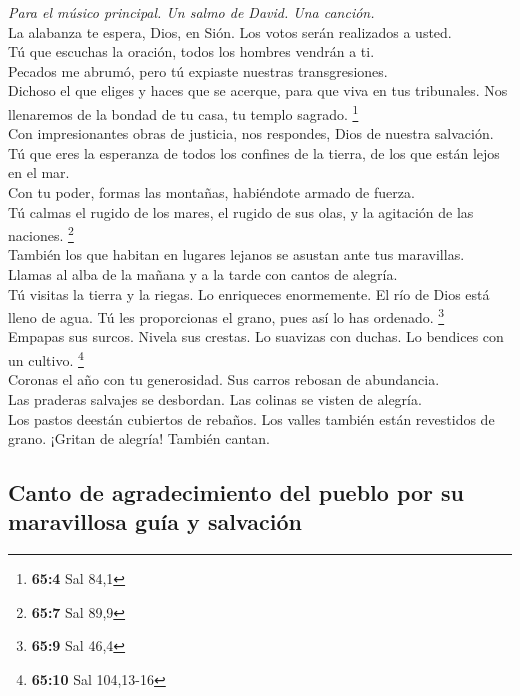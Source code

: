 \emph{Para el músico principal. Un salmo de David. Una canción.}\\
 La alabanza te espera, Dios, en Sión. Los votos serán
realizados a usted.\\
 Tú que escuchas la oración, todos los hombres vendrán a
ti.\\
 Pecados me abrumó, pero tú expiaste nuestras
transgresiones.\\
 Dichoso el que eliges y haces que se acerque, para que
viva en tus tribunales. Nos llenaremos de la bondad de tu casa, tu
templo sagrado. \footnote{\textbf{65:4} Sal 84,1}\\
 Con impresionantes obras de justicia, nos respondes, Dios
de nuestra salvación. Tú que eres la esperanza de todos los confines de
la tierra, de los que están lejos en el mar.\\
 Con tu poder, formas las montañas, habiéndote armado de
fuerza.\\
 Tú calmas el rugido de los mares, el rugido de sus olas,
y la agitación de las naciones. \footnote{\textbf{65:7} Sal 89,9}\\
 También los que habitan en lugares lejanos se asustan
ante tus maravillas. Llamas al alba de la mañana y a la tarde con cantos
de alegría.\\
 Tú visitas la tierra y la riegas. Lo enriqueces
enormemente. El río de Dios está lleno de agua. Tú les proporcionas el
grano, pues así lo has ordenado. \footnote{\textbf{65:9} Sal 46,4}\\
 Empapas sus surcos. Nivela sus crestas. Lo suavizas con
duchas. Lo bendices con un cultivo. \footnote{\textbf{65:10} Sal
  104,13-16}\\
 Coronas el año con tu generosidad. Sus carros rebosan de
abundancia.\\
 Las praderas salvajes se desbordan. Las colinas se
visten de alegría.\\
 Los pastos deestán cubiertos de rebaños. Los valles
también están revestidos de grano. ¡Gritan de alegría! También cantan.

\hypertarget{canto-de-agradecimiento-del-pueblo-por-su-maravillosa-guuxeda-y-salvaciuxf3n}{%
\subsection{Canto de agradecimiento del pueblo por su maravillosa guía y
salvación}\label{canto-de-agradecimiento-del-pueblo-por-su-maravillosa-guuxeda-y-salvaciuxf3n}}

